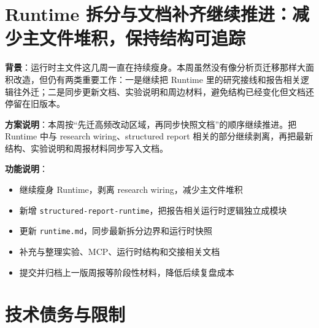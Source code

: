 \documentclass[UTF8]{ctexart}
\begin{document}
\section{Runtime 拆分与文档补齐继续推进：减少主文件堆积，保持结构可追踪}

\textbf{背景}：运行时主文件这几周一直在持续瘦身。本周虽然没有像分析页迁移那样大面积改造，但仍有两类重要工作：一是继续把 Runtime 里的研究接线和报告相关逻辑往外迁；二是同步更新文档、实验说明和周边材料，避免结构已经变化但文档还停留在旧版本。

\textbf{方案说明}：本周按“先迁高频改动区域，再同步快照文档”的顺序继续推进。把 Runtime 中与 research wiring、structured report 相关的部分继续剥离，再把最新结构、实验说明和周报材料同步写入文档。

\textbf{功能说明}：
\begin{itemize}
\item 继续瘦身 Runtime，剥离 research wiring，减少主文件堆积
\item 新增 \texttt{structured-report-runtime}，把报告相关运行时逻辑独立成模块
\item 更新 \texttt{runtime.md}，同步最新拆分边界和运行时快照
\item 补充与整理实验、MCP、运行时结构和交接相关文档
\item 提交并归档上一版周报等阶段性材料，降低后续复盘成本
\end{itemize}

\section{技术债务与限制}
\end{document}
